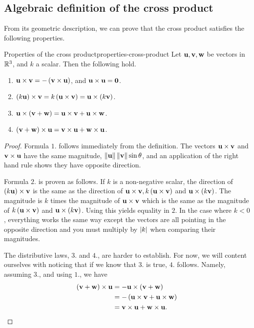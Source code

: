 \subsection{Algebraic definition of the cross product}

From its geometric description, we can prove that the cross product
satisfies the following properties.

\begin{proposition}{Properties of the cross product}{properties-cross-product}
  Let $\mbox{\bf u}, \mbox{\bf v}, \mbox{\bf w}$ be vectors in $\mathbb{R}^3$, and $k$ a
  scalar. Then the following hold.%
  \begin{enumerate}
  \item
    $\mbox{\bf u}\times \mbox{\bf v}= -\left(\mbox{\bf v}\times \mbox{\bf u}\right)$,
    and $\mbox{\bf u}\times \mbox{\bf u}=\mbox{\bf 0}$.
  \item $\left(k \mbox{\bf u}\right)\times \mbox{\bf v}= k \left(\mbox{\bf u}\times \mbox{\bf v}\right) 
    =\mbox{\bf u}\times \left(k \mbox{\bf v}\right)$.
  \item $\mbox{\bf u}\times \left(\mbox{\bf v}+\mbox{\bf w}\right) =\mbox{\bf u}\times \mbox{\bf v}+\mbox{\bf u}\times \mbox{\bf w}$.
  \item $\left(\mbox{\bf v}+\mbox{\bf w}\right) \times \mbox{\bf u}=\mbox{\bf v} \times \mbox{\bf u}+\mbox{\bf w}\times \mbox{\bf u}$.
  \end{enumerate}
\end{proposition}

\begin{proof}
  Formula $1$. follows immediately from the definition. The vectors
  $\mbox{\bf u}\times \mbox{\bf v}$ and $\mbox{\bf v}\times \mbox{\bf u}$ have the
  same magnitude, $\left\|\mbox{\bf u}\right\|\left\|\mbox{\bf v}\right\|\sin \theta$, and an
  application of the right hand rule shows they have opposite
  direction.

  Formula $2$. is proven as follows. If $k $ is a non-negative scalar,
  the direction of $\left(k \mbox{\bf u}\right) \times \mbox{\bf v}$ is the same as
  the direction of
  $\mbox{\bf u}\times \mbox{\bf v}, k \left(\mbox{\bf u}\times \mbox{\bf v}\right) $ and
  $\mbox{\bf u}\times \left( k \mbox{\bf v}\right)$. The magnitude is $k$ times the
  magnitude of $\mbox{\bf u}\times \mbox{\bf v}$ which is the same as the
  magnitude of $k \left(\mbox{\bf u}\times \mbox{\bf v}\right) $ and
  $\mbox{\bf u}\times \left( k \mbox{\bf v}\right)$. Using this yields equality in
  $2$. In the case where $k <0$, everything works the same way except
  the vectors are all pointing in the opposite direction and you must
  multiply by $\left|k \right|$ when comparing their magnitudes.

  The distributive laws, $3$. and $4$., are harder to establish. For
  now, we will content ourselves with noticing that if we know that
  $3$. is true, $4$. follows. Namely, assuming $3$., and using $1$.,
  we have
  \begin{align*}
    \left(\mbox{\bf v}+\mbox{\bf w}\right) \times \mbox{\bf u}
    & =-\mbox{\bf u}\times \left(
      \mbox{\bf v}+\mbox{\bf w}\right) \\
    & =-\left(\mbox{\bf u}\times \mbox{\bf v}+\mbox{\bf u}\times \mbox{\bf w}\right) \\
    & =\mbox{\bf v}\times \mbox{\bf u}+\mbox{\bf w}\times \mbox{\bf u}.
  \end{align*}
\end{proof}

